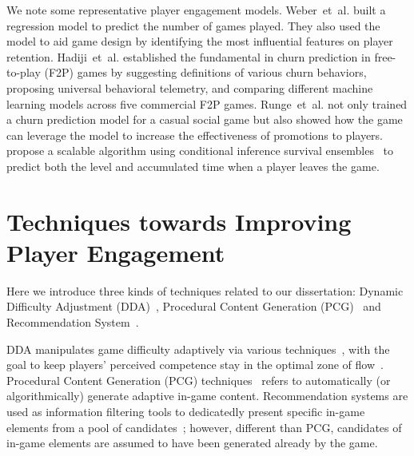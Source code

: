 We note some representative player engagement models. Weber~et~al.\! \cite{weber2011modeling} built a regression model to predict the number of games played. They also used the model to aid game design by identifying the most influential features on player retention. Hadiji~et~al.\! \cite{hadiji2014predicting} established the fundamental in churn prediction in free-to-play (F2P) games by suggesting definitions of various churn behaviors, proposing universal behavioral telemetry, and comparing different machine learning models across five commercial F2P games. Runge~et~al.\! \cite{runge2014churn} not only trained a churn prediction model for a casual social game but also showed how the game can leverage the model to increase the effectiveness of promotions to players. \cite{bertens2017games} propose a scalable algorithm using conditional inference survival ensembles~\cite{hothorn2006unbiased} to predict both the level and accumulated time when a player leaves the game.


\section{Techniques towards Improving Player Engagement}

Here we introduce three kinds of techniques related to our dissertation: Dynamic Difficulty Adjustment (DDA)~\cite{hunicke2005case}, Procedural Content Generation (PCG)~\cite{yannakakis2011experience,togelius2011search} and Recommendation System~\cite{medler2011using}. 


DDA manipulates game difficulty adaptively via various techniques~\cite{hunicke2005case}, with the goal to keep players' perceived competence stay in the optimal zone of flow~\cite{flow1990psychology,sweetser2005gameflow,chen2007flow}. Procedural Content Generation (PCG) techniques~\cite{yannakakis2011experience,togelius2011search} refers to automatically (or algorithmically) generate adaptive in-game content. Recommendation systems are used as information filtering tools to dedicatedly present specific in-game elements from a pool of candidates~\cite{medler2011using}; however, different than PCG, candidates of in-game elements are assumed to have been generated already by the game.


